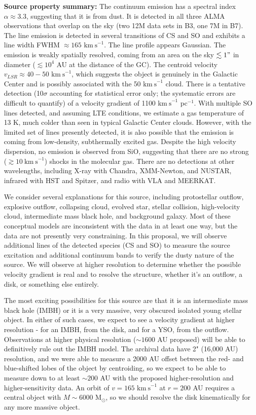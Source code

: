 \documentclass[12pt,a4paper]{article}  %
\newcommand{\msun}{\ensuremath{\mathrm{M}_\odot}\xspace}
\newcommand{\kms}{\ensuremath{\mathrm{km~s}^{-1}}\xspace}
\begin{document}
\textbf{Source property summary:}
The continuum emission has a spectral index $\alpha\approx3.3$, suggesting that it is from dust.
It is detected in all three ALMA observations that overlap on the sky (two 12M data sets in B3, one 7M in B7).
The line emission is detected in several transitions of CS and SO and exhibits a line width FWHM $\approx165$ \kms.  The line profile appears Gaussian.
The emission is weakly spatially resolved, coming from an area on the sky $\lesssim1"$ in diameter ($\lesssim10^4$ AU at the distance of the GC).
The centroid velocity $v_{LSR}\approx40-50$ \kms, which suggests the object is genuinely in the Galactic Center and is possibly associated with the 50 \kms cloud.
There is a tentative detection (10$\sigma$ accounting for statistical error only; the systematic errors are difficult to quantify) of a velocity gradient of 1100 \kms pc$^{-1}$.
With multiple SO lines detected, and assuming LTE conditions, we estimate a gas temperature of 13 K, much colder than seen in typical Galactic Center clouds.
However, with the limited set of lines presently detected, it is also possible that the emission is coming from low-density, subthermally excited gas.
Despite the high velocity dispersion, no emission is observed from SiO, suggesting that there are no strong ($\gtrsim10~\kms$) shocks in the molecular gas.
There are no detections at other wavelengths, including X-ray with Chandra, XMM-Newton, and NUSTAR, infrared with HST and Spitzer, and radio with VLA and MEERKAT.

We consider several explanations for this source, including protostellar outflow, explosive outflow, collapsing cloud, evolved star, stellar collision, high-velocity cloud, intermediate mass black hole, and background galaxy.
Most of these conceptual models are inconsistent with the data in at least one way, but the data are not presently very constraining.
In this proposal, we will observe additional lines of the detected species (CS and SO) to measure the source excitation and additional continuum bands to verify the dusty nature of the source.
We will observe at higher resolution to determine whether the possible velocity gradient is real and to resolve the structure, whether it's an outflow, a disk, or something else entirely.

The most exciting possibilities for this source are that it is an intermediate mass black hole (IMBH) or it is a very massive, very obscured isolated young stellar object.
In either of such cases, we expect to see a velocity gradient at higher resolution - for an IMBH, from the disk, and for a YSO, from the outflow.
Observations at higher physical resolution ($\sim1600$ AU proposed) will be able to definitively rule out the IMBH model.
The archival data have 2" (16,000 AU) resolution, and we were able to measure a 2000 AU offset between the red- and blue-shifted lobes of the object by centroiding, so we expect to be able to measure down to at least $\sim200$ AU with the proposed higher-resolution and higher-sensitivity data.
An orbit of $v=165$ \kms at $r=200$ AU requires a central object with $M\sim6000$ \msun, so we should resolve the disk kinematically for any more massive object.
\end{document}
